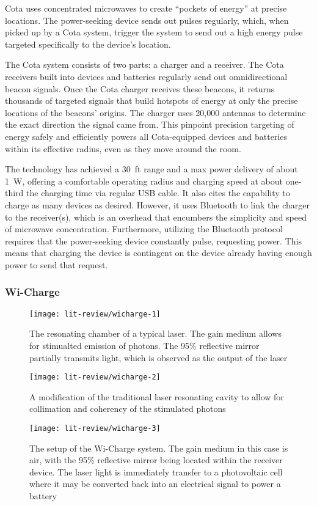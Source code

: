 Cota uses concentrated microwaves to create ``pockets of energy'' at precise locations. The power-seeking device sends out pulses regularly, which, when picked up by a Cota system, trigger the system to send out a high energy pulse targeted specifically to the device's location.

The Cota system consists of two parts: a charger and a receiver. The Cota receivers built into devices and batteries regularly send out omnidirectional beacon signals. Once the Cota charger receives these beacons, it returns thousands of targeted signals that build hotspots of energy at only the precise locations of the beacons' origins. The charger uses 20,000 antennas to determine the exact direction the signal came from. This pinpoint precision targeting of energy safely and efficiently powers all Cota-equipped devices and batteries within its effective radius, even as they move around the room.

The technology has achieved a 30~ft range and a max power delivery of about 1~W, offering a comfortable operating radius and charging speed at about one-third the charging time via regular USB cable. It also cites the capability to charge as many devices as desired. However, it uses Bluetooth to link the charger to the receiver(s), which is an overhead that encumbers the simplicity and speed of microwave concentration. Furthermore, utilizing the Bluetooth protocol requires that the power-seeking device constantly pulse, requesting power. This means that charging the device is contingent on the device already having enough power to send that request.

\subsubsection{Wi-Charge}

\begin{figure}[h!]
\centering
\texttt{[image: lit-review/wicharge-1]}
    \caption{The resonating chamber of a typical laser. The gain medium allows for stimualted emission of photons. The 95\% reflective mirror partially transmits light, which is observed as the output of the laser}
    \label{fig:lit-review-wicharge-1}
\end{figure}
\begin{figure}[h!]
\centering
\texttt{[image: lit-review/wicharge-2]}
    \caption{A modification of the traditional laser resonating cavity to allow for collimation and coherency of the stimulated photons}
    \label{fig:lit-review-wicharge-2}
\end{figure}
\begin{figure}[h!]
\centering
\texttt{[image: lit-review/wicharge-3]}
    \caption{The setup of the Wi-Charge system. The gain medium in this case is air, with the 95\% reflective mirror being located within the receiver device. The laser light is immediately transfer to a photovoltaic cell where it may be converted back into an electrical signal to power a battery}
    \label{fig:lit-review-wicharge-3}
\end{figure}

